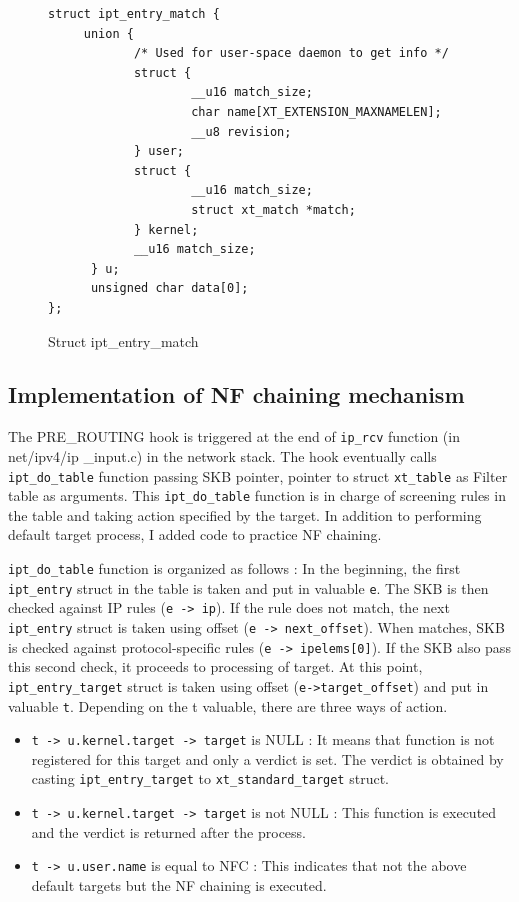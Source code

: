 \begin{figure}			
	\begin{center}
		\begin{screen}
			\begin{verbatim}
struct ipt_entry_match {
     union {
            /* Used for user-space daemon to get info */
            struct {
                    __u16 match_size;
                    char name[XT_EXTENSION_MAXNAMELEN];
                    __u8 revision;
            } user;
            struct {
                    __u16 match_size;
                    struct xt_match *match;
            } kernel;
            __u16 match_size;
      } u;
      unsigned char data[0];
};
			\end{verbatim}
		\end{screen}
	\end{center}	
	\caption{Struct ipt\_entry\_match}
	\label{fig: imp4}
\end{figure}

\subsection{Implementation of NF chaining mechanism}
The PRE\_ROUTING hook is triggered at the end of {\tt ip\_rcv} function (in net/ipv4/ip
\_input.c) in the network stack. The hook eventually calls {\tt ipt\_do\_table} function passing SKB pointer, pointer to struct {\tt xt\_table} as Filter table as arguments. This {\tt ipt\_do\_table} function is in charge of screening rules in the table and taking action specified by the  target. In addition to performing default target process, I added code to practice NF chaining. 

{\tt ipt\_do\_table} function is organized as follows : In the beginning, the first {\tt ipt\_entry} struct  in the table is taken and put in valuable {\tt e}. The SKB is then checked against IP rules ({\tt e -\verb#># ip}). If the rule does not match, the next {\tt ipt\_entry} struct is taken using offset ({\tt e -\verb#># next\_offset}). When matches, SKB is checked against protocol-specific rules ({\tt e -\verb#># ipelems[0]}). If the SKB also pass this second check, it proceeds to processing of target. At this point, {\tt ipt\_entry\_target} struct is taken using offset ({\tt e-\verb#>#target\_offset}) and put in valuable {\tt t}. Depending on the t valuable, there are three ways of action. 
\begin{itemize}
	\item {\tt t -\verb#># u.kernel.target -\verb#># target} is NULL : It means that function is not registered for this target and only a verdict is set. The verdict is obtained by casting {\tt ipt\_entry\_target} to {\tt xt\_standard\_target} struct. 
	\item {\tt t -\verb#># u.kernel.target -\verb#># target} is not NULL : This function is executed and the verdict is returned after the process.   
	\item {\tt t -\verb#># u.user.name} is equal to NFC : This indicates that not the above default targets but the NF chaining is executed. 
\end{itemize}

